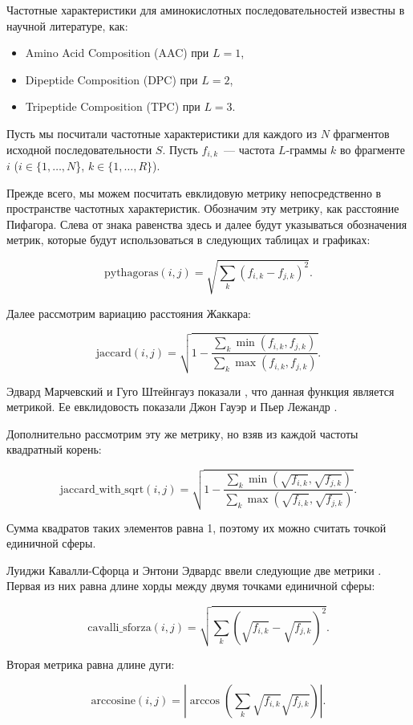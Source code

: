 Частотные характеристики для аминокислотных последовательностей известны \cite{Bhasin2004} в научной литературе, как:
\begin{itemize}
  \item Amino Acid Composition (AAC) при $L = 1$,
  \item Dipeptide Composition (DPC) при  $L = 2$,
  \item Tripeptide Composition (TPC) при  $L = 3$.
\end{itemize}

Пусть мы посчитали частотные характеристики для каждого из $N$ фрагментов исходной последовательности $S$. Пусть $f_{i,k}$~--- частота $L$-граммы $k$ во фрагменте $i$ ($i \in \{1,\ldots, N$\}, $k \in \{1, \ldots, R\}$).

Прежде всего, мы можем посчитать евклидовую метрику непосредственно в пространстве частотных характеристик. Обозначим эту метрику, как расстояние Пифагора. Слева от знака равенства здесь и далее будут указываться обозначения метрик, которые будут использоваться в следующих таблицах и графиках:

$$\text{pythagoras}(i,j) = \sqrt{\sum_k \left(f_{i,k} - f_{j,k}\right)^2}.$$

Далее рассмотрим вариацию расстояния Жаккара:

$$\text{jaccard}(i, j) = \sqrt{1-\frac{\sum_k \min(f_{i,k}, f_{j,k})}{\sum_k \max(f_{i,k}, f_{j,k})}}.$$

Эдвард Марчевский и Гуго Штейнгауз показали \cite{Marczewski1958}, что данная функция является метрикой. Ее евклидовость показали Джон Гауэр и Пьер Лежандр \cite{Gower1986}.

Дополнительно рассмотрим эту же метрику, но взяв из каждой частоты квадратный корень:

$$\text{jaccard\_with\_sqrt}(i, j) = \sqrt{1-\frac{\sum_k \min(\sqrt{f_{i,k}}, \sqrt{f_{j,k}})}{\sum_k \max(\sqrt{f_{i,k}}, \sqrt{f_{j,k}})}}.$$

Сумма квадратов таких элементов равна 1, поэтому их можно считать точкой единичной сферы.

Луиджи Кавалли-Сфорца и Энтони Эдвардс ввели следующие две метрики \cite{CavalliSforza1967}. Первая из них равна длине хорды между двумя точками единичной сферы:

$$\text{cavalli\_sforza}(i,j) = \sqrt{\sum_k \left(\sqrt{f_{i,k}} - \sqrt{f_{j,k}}\right)^2}.$$

Вторая метрика равна длине дуги:

$$\text{arccosine}(i,j) = \left|\arccos\left(\sum_k\sqrt{f_{i,k}}\sqrt{f_{j,k}}\right)\right|.$$

